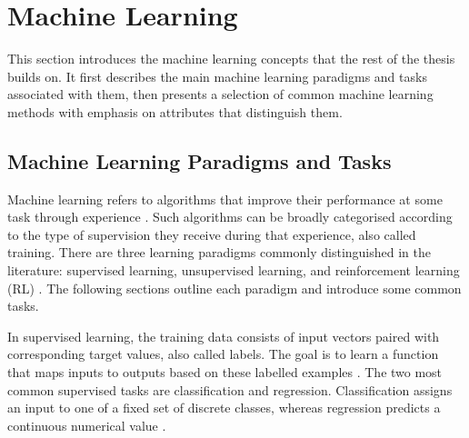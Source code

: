 \section{Machine Learning}
\label{sec:machine-learning}

This section introduces the machine learning concepts that the rest of 
the thesis builds on. It first describes the main machine learning paradigms and 
tasks associated with them, then presents a selection of common 
machine learning methods with emphasis on attributes that distinguish them. 

\subsection{Machine Learning Paradigms and Tasks}
\label{sec:machine-learning-paradigms-and-tasks}

Machine learning refers to algorithms that improve their performance 
at some task through experience 
\parencite{mitchell1997machine_learning}. 
Such algorithms can be broadly categorised according to the type of 
supervision they receive during that experience, also called training. 
There are three learning paradigms commonly distinguished in the literature: 
supervised learning, unsupervised learning, and reinforcement learning (RL)
\parencites[3]{bishop2006pattern_recognition_machine_learning}[Chapter~5]{Goodfellow-et-al-2016}.
The following sections outline each paradigm and introduce some common
tasks.

In supervised learning, the training data consists of input vectors paired 
with corresponding target values, also called labels. The goal is to learn 
a function that maps inputs to outputs based on these labelled examples 
\parencite{sarker2021machine_learning_algorithms_real_world_applications_research_directions}. 
The two most common supervised tasks are classification and regression. 
Classification assigns an input to one of a fixed set of discrete 
classes, whereas regression predicts a continuous numerical value
\parencites[3]{bishop2006pattern_recognition_machine_learning}[Chapter~5]{Goodfellow-et-al-2016}.

